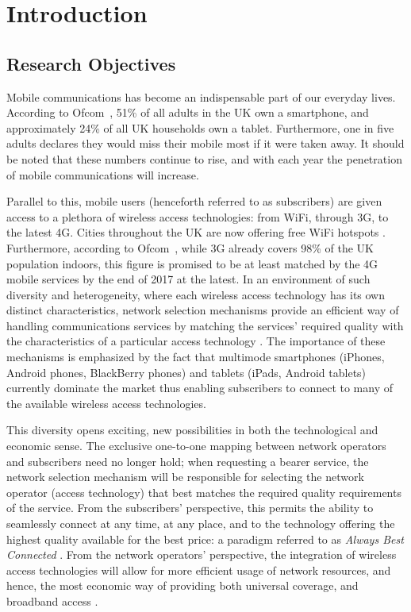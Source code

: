 \chapter{Introduction} %
\label{cha:introduction}

\minitoc
\vspace{10mm}

\section{Research Objectives} %
\label{sec:research_objectives_introduction}
Mobile communications has become an indispensable part of our everyday lives. According to Ofcom~\cite{OfcomReport2013}, 51\% of all adults in the UK own a smartphone, and approximately 24\% of all UK households own a tablet. Furthermore, one in five adults declares they would miss their mobile most if it were taken away. It should be noted that these numbers continue to rise, and with each year the penetration of mobile communications will increase.

Parallel to this, mobile users (henceforth referred to as subscribers) are given access to a plethora of wireless access technologies: from WiFi, through 3G, to the latest 4G. Cities throughout the UK are now offering free WiFi hotspots \cite{BBCWiFiGlasgow2014}. Furthermore, according to Ofcom~\cite{OfcomLTE2013}, while 3G already covers 98\% of the UK population indoors, this figure is promised to be at least matched by the 4G mobile services by the end of 2017 at the latest. In an environment of such diversity and heterogeneity, where each wireless access technology has its own distinct characteristics, network selection mechanisms provide an efficient way of handling communications services by matching the services' required quality with the characteristics of a particular access technology \cite{HossainBeaubrun09}. The importance of these mechanisms is emphasized by the fact that multimode smartphones (iPhones, Android phones, BlackBerry phones) and tablets (iPads, Android tablets) currently dominate the market thus enabling subscribers to connect to many of the available wireless access technologies.

This diversity opens exciting, new possibilities in both the technological and economic sense. The exclusive one-to-one mapping between network operators and subscribers need no longer hold; when requesting a bearer service, the network selection mechanism will be responsible for selecting the network operator (access technology) that best matches the required quality requirements of the service. From the subscribers' perspective, this permits the ability to seamlessly connect at any time, at any place, and to the technology offering the highest quality available for the best price: a paradigm referred to as \emph{Always Best Connected} \cite{ABC03}. From the network operators' perspective, the integration of wireless access technologies will allow for more efficient usage of network resources, and hence, the most economic way of providing both universal coverage, and broadband access \cite{HossainBeaubrun09}.

